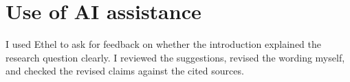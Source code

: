 \chapter*{Use of AI assistance}

I used Ethel to ask for feedback on whether the introduction explained the
research question clearly. I reviewed the suggestions, revised the wording
myself, and checked the revised claims against the cited sources.
